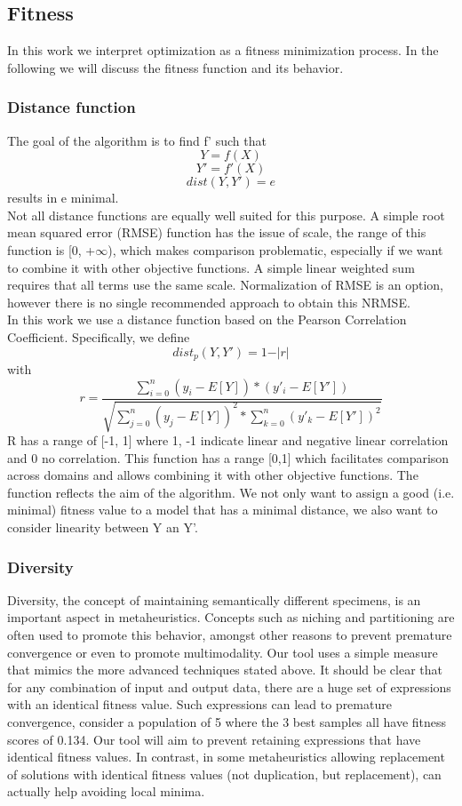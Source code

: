 \subsection{Fitness}
In this work we interpret optimization as a fitness minimization process. In the following we will discuss the fitness function and its behavior.
\subsubsection{Distance function}
The goal of the algorithm is to find f' such that
\[Y = f(X)\]
\[Y' = f'(X)\]
\[dist(Y, Y') = e\]
results in e minimal.\\
Not all distance functions are equally well suited for this purpose. A simple root mean squared error (RMSE) function has the issue of scale, the range of this function is [0, +$\infty$), which makes comparison problematic, especially if we want to combine it with other objective functions. A simple linear weighted sum requires that all terms use the same scale. 
Normalization of RMSE is an option, however there is no single recommended approach to obtain this NRMSE. \\
In this work we use a distance function based on the Pearson Correlation Coefficient. Specifically, we define 
\[
dist_p(Y, Y') = 1 - \vert r \vert
\]
with
\[
r = \frac{\sum_{i=0}^{n}{(y_i-E[Y])*(y'_i-E[Y'])}}{\sqrt{\sum_{j=0}^{n}{(y_j-E[Y])^2}*\sum_{k=0}^{n}{(y'_k-E[Y'])^2}}}
\]
R has a range of [-1, 1] where 1, -1 indicate linear and negative linear correlation and 0 no correlation.
This function has a range [0,1] which facilitates comparison across domains and allows combining it with other objective functions.
The function reflects the aim of the algorithm. We not only want to assign a good (i.e. minimal) fitness value to a model that has a minimal distance, we also want to consider linearity between Y an Y'. 

\subsubsection{Diversity}\label{subsubdiversity}
Diversity, the concept of maintaining semantically different specimens, is an important aspect in metaheuristics. Concepts such as niching and partitioning are often used to promote this behavior, amongst other reasons to prevent premature convergence or even to promote multimodality.
Our tool uses a simple measure that mimics the more advanced techniques stated above. It should be clear that for any combination of input and output data, there are a huge set of expressions with an identical fitness value. Such expressions can lead to premature convergence, consider a population of 5 where the 3 best samples all have fitness scores of 0.134. Our tool will aim to prevent retaining expressions that have identical fitness values.
In contrast, in some metaheuristics \cite{DE} allowing replacement of solutions with identical fitness values (not duplication, but replacement), can actually help avoiding local minima. 


